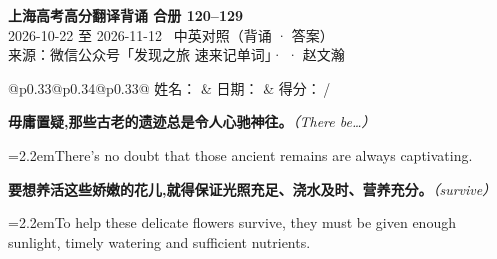 \documentclass[11pt,a4paper]{article}
\newcommand{\num}[1]{\makebox[1.9em][r]{#1.}\hspace{0.3em}}
\newcommand{\prompt}[1]{\emph{\textcolor{tipblue}{\small（#1）}}}
\begin{document}
\pagestyle{plain}
\begin{center}
{\LARGE\bfseries 上海高考高分翻译背诵 \quad 合册 120–129}\\[0.25em]
{\large 2026-10-22 至 2026-11-12 \quad\ 中英对照（背诵 · 答案）}\\[0.35em]
{\footnotesize 来源：微信公众号「发现之旅 速来记单词」·  · 赵文瀚}
\end{center}

\vspace{0.4em}
\noindent\begin{tabular}{@{}p{0.33\textwidth}@{}p{0.34\textwidth}@{}p{0.33\textwidth}@{}}
姓名：\underline{\hspace{2.0cm}} & 日期：\underline{\hspace{2.0cm}} & 得分：\underline{\hspace{1.4cm}}\,/ \\
\end{tabular}

\vspace{0.5em}

\vspace{0.8em}
\vspace{0.35em}\vspace{0.15em}

\begin{minipage}{\linewidth}

\num{1}\textbf{毋庸置疑,那些古老的遗迹总是令人心驰神往。}\prompt{There be…}

\vspace{0.15em}

\noindent\hangindent=2.2em\hspace{2.2em}There’s no doubt that those ancient remains are always captivating.

\end{minipage}

\begin{minipage}{\linewidth}

\num{2}\textbf{要想养活这些娇嫩的花儿,就得保证光照充足、浇水及时、营养充分。}\prompt{survive}

\vspace{0.15em}

\noindent\hangindent=2.2em\hspace{2.2em}To help these delicate flowers survive, they must be given enough sunlight, timely watering and sufficient nutrients.

\end{minipage}
\end{document}

